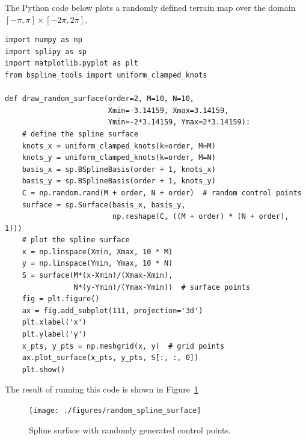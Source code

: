 \documentclass{article}
\newcommand{\bbf}{\mathbf{b}}
\newcommand{\cbf}{\mathbf{c}}
\newcommand{\sbf}{\mathbf{s}}
\newcommand{\xbf}{\mathbf{x}}
\begin{document}

The Python code below plots a randomly defined terrain map over the domain $[-\pi, \pi]\times[-2\pi, 2\pi]$.
\begin{lstlisting}
import numpy as np
import splipy as sp
import matplotlib.pyplot as plt
from bspline_tools import uniform_clamped_knots

def draw_random_surface(order=2, M=10, N=10,
                        Xmin=-3.14159, Xmax=3.14159,
                        Ymin=-2*3.14159, Ymax=2*3.14159):
    # define the spline surface
    knots_x = uniform_clamped_knots(k=order, M=M)
    knots_y = uniform_clamped_knots(k=order, M=N)
    basis_x = sp.BSplineBasis(order + 1, knots_x)
    basis_y = sp.BSplineBasis(order + 1, knots_y)
    C = np.random.rand(M + order, N + order)  # random control points
    surface = sp.Surface(basis_x, basis_y,
                         np.reshape(C, ((M + order) * (N + order), 1)))
    # plot the spline surface
    x = np.linspace(Xmin, Xmax, 10 * M)
    y = np.linspace(Ymin, Ymax, 10 * N)
    S = surface(M*(x-Xmin)/(Xmax-Xmin),
                N*(y-Ymin)/(Ymax-Ymin))  # surface points
    fig = plt.figure()
    ax = fig.add_subplot(111, projection='3d')
    plt.xlabel('x')
    plt.ylabel('y')
    x_pts, y_pts = np.meshgrid(x, y)  # grid points
    ax.plot_surface(x_pts, y_pts, S[:, :, 0])
    plt.show()
\end{lstlisting}
The result of running this code is shown in Figure~\ref{fig:random_spline_surface}
\begin{figure}[hbt]
  \centering\texttt{[image: ./figures/random\_spline\_surface]}
  \caption{Spline surface with randomly generated control points.}
  \label{fig:random_spline_surface}  
\end{figure}
\end{document}
